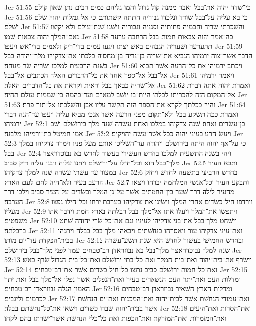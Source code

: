 Jer 51:55  כי־שׁדד יהוה את־בבל ואבד ממנה קול גדול והמו גליהם כמים רבים נתן שׁאון קולם׃
Jer 51:56  כי בא עליה על־בבל שׁודד ונלכדו גבוריה חתתה קשׁתותם כי אל גמלות יהוה שׁלם ישׁלם׃
Jer 51:57  והשׁכרתי שׂריה וחכמיה פחותיה וסגניה וגבוריה וישׁנו שׁנת־עולם ולא יקיצו נאם־המלך יהוה צבאות שׁמו׃
Jer 51:58  כה־אמר יהוה צבאות חמות בבל הרחבה ערער תתערער ושׁעריה הגבהים באשׁ יצתו ויגעו עמים בדי־ריק ולאמים בדי־אשׁ ויעפו׃
Jer 51:59  הדבר אשׁר־צוה ירמיהו הנביא את־שׂריה בן־נריה בן־מחסיה בלכתו את־צדקיהו מלך־יהודה בבל בשׁנת הרבעית למלכו ושׂריה שׂר מנוחה׃
Jer 51:60  ויכתב ירמיהו את כל־הרעה אשׁר־תבוא אל־בבל אל־ספר אחד את כל־הדברים האלה הכתבים אל־בבל׃
Jer 51:61  ויאמר ירמיהו אל־שׂריה כבאך בבל וראית וקראת את כל־הדברים האלה׃
Jer 51:62  ואמרת יהוה אתה דברת אל־המקום הזה להכריתו לבלתי היות־בו יושׁב למאדם ועד־בהמה כי־שׁממות עולם תהיה׃
Jer 51:63  והיה ככלתך לקרא את־הספר הזה תקשׁר עליו אבן והשׁלכתו אל־תוך פרת׃
Jer 51:64  ואמרת ככה תשׁקע בבל ולא־תקום מפני הרעה אשׁר אנכי מביא עליה ויעפו עד־הנה דברי ירמיהו׃
Jer 52:1  בן־עשׂרים ואחת שׁנה צדקיהו במלכו ואחת עשׂרה שׁנה מלך בירושׁלם ושׁם אמו חמיטל בת־ירמיהו מלבנה׃
Jer 52:2  ויעשׂ הרע בעיני יהוה ככל אשׁר־עשׂה יהויקים׃
Jer 52:3  כי על־אף יהוה היתה בירושׁלם ויהודה עד־השׁליכו אותם מעל פניו וימרד צדקיהו במלך בבל׃
Jer 52:4  ויהי בשׁנה התשׁעית למלכו בחדשׁ העשׂירי בעשׂור לחדשׁ בא נבוכדראצר מלך־בבל הוא וכל־חילו על־ירושׁלם ויחנו עליה ויבנו עליה דיק סביב׃
Jer 52:5  ותבא העיר במצור עד עשׁתי עשׂרה שׁנה למלך צדקיהו׃
Jer 52:6  בחדשׁ הרביעי בתשׁעה לחדשׁ ויחזק הרעב בעיר ולא־היה לחם לעם הארץ׃
Jer 52:7  ותבקע העיר וכל־אנשׁי המלחמה יברחו ויצאו מהעיר לילה דרך שׁער בין־החמתים אשׁר על־גן המלך וכשׂדים על־העיר סביב וילכו דרך הערבה׃
Jer 52:8  וירדפו חיל־כשׂדים אחרי המלך וישׂיגו את־צדקיהו בערבת ירחו וכל־חילו נפצו מעליו׃
Jer 52:9  ויתפשׂו את־המלך ויעלו אתו אל־מלך בבל רבלתה בארץ חמת וידבר אתו משׁפטים׃
Jer 52:10  וישׁחט מלך־בבל את־בני צדקיהו לעיניו וגם את־כל־שׂרי יהודה שׁחט ברבלתה׃
Jer 52:11  ואת־עיני צדקיהו עור ויאסרהו בנחשׁתים ויבאהו מלך־בבל בבלה ויתנהו בבית־הפקדת עד־יום מותו׃
Jer 52:12  ובחדשׁ החמישׁי בעשׂור לחדשׁ היא שׁנת תשׁע־עשׂרה שׁנה למלך נבוכדראצר מלך־בבל בא נבוזראדן רב־טבחים עמד לפני מלך־בבל בירושׁלם׃
Jer 52:13  וישׂרף את־בית־יהוה ואת־בית המלך ואת כל־בתי ירושׁלם ואת־כל־בית הגדול שׂרף באשׁ׃
Jer 52:14  ואת־כל־חמות ירושׁלם סביב נתצו כל־חיל כשׂדים אשׁר את־רב־טבחים׃
Jer 52:15  ומדלות העם ואת־יתר העם הנשׁארים בעיר ואת־הנפלים אשׁר נפלו אל־מלך בבל ואת יתר האמון הגלה נבוזראדן רב־טבחים׃
Jer 52:16  ומדלות הארץ השׁאיר נבוזראדן רב־טבחים לכרמים וליגבים׃
Jer 52:17  ואת־עמודי הנחשׁת אשׁר לבית־יהוה ואת־המכנות ואת־ים הנחשׁת אשׁר בבית־יהוה שׁברו כשׂדים וישׂאו את־כל־נחשׁתם בבלה׃
Jer 52:18  ואת־הסרות ואת־היעים ואת־המזמרות ואת־המזרקת ואת־הכפות ואת כל־כלי הנחשׁת אשׁר־ישׁרתו בהם לקחו׃

